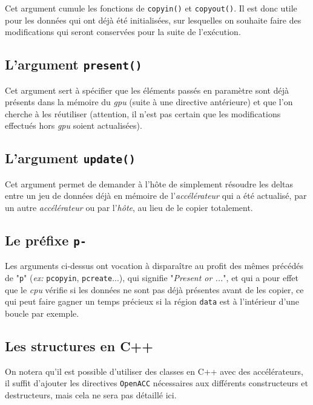 \documentclass{article}
\begin{document}
Cet argument cumule les fonctions de \texttt{copyin()} et \texttt{copyout()}. Il est donc utile pour les données qui ont déjà été initialisées, sur lesquelles on souhaite faire des modifications qui seront conservées pour la suite de l'exécution.

\subsection{L'argument \texttt{present()}}

Cet argument sert à spécifier que les éléments passés en paramètre sont déjà présents dans la mémoire du \textit{\gls{gpu}} (suite à une directive antérieure) et que l'on cherche à les réutiliser (attention, il n'est pas certain que les modifications effectués hors \textit{\gls{gpu}} soient actualisées).

\subsection{L'argument \texttt{update()}}

Cet argument permet de demander à l'hôte de simplement résoudre les deltas entre un jeu de données déjà en mémoire de l'\textit{accélérateur} qui a été actualisé, par un autre \textit{accélérateur} ou par l'\textit{hôte}, au lieu de le copier totalement.

\subsection{Le préfixe \texttt{p-}}

Les arguments ci-dessus ont vocation à disparaître au profit des mêmes précédés de "\texttt{p}" (\textit{ex: } \texttt{pcopyin}, \texttt{pcreate}...), qui signifie "\textit{Present or ...}", et qui a pour effet que le \textit{\gls{cpu}} vérifie si les données ne sont pas déjà présentes avant de les copier, ce qui peut faire gagner un temps précieux si la région \texttt{data} est à l'intérieur d'une boucle par exemple.

\subsection{Les structures en C++}

On notera qu'il est possible d'utiliser des classes en C++ avec des accélérateurs, il suffit d'ajouter les directives \texttt{OpenACC} nécessaires aux différents constructeurs et destructeurs, mais cela ne sera pas détaillé ici.
\end{document}
